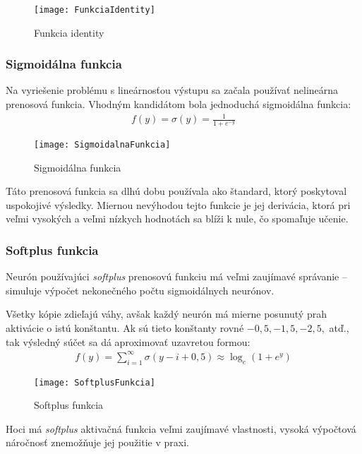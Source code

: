 \begin{figure}[H]
  \centering
  \texttt{[image: FunkciaIdentity]}
  \caption{Funkcia identity}
  \label{fig:Identita}
\end{figure}

\subsubsection{Sigmoidálna funkcia}

Na vyriešenie problému s lineárnosťou výstupu sa začala používať nelineárna prenosová funkcia. Vhodným kandidátom bola jednoduchá sigmoidálna funkcia:
\begin{eqnarray}
  f(y) = \sigma(y) = \frac{1}{1 + e^{-y}}
\end{eqnarray}

\begin{figure}[H]
  \centering
  \texttt{[image: SigmoidalnaFunkcia]}
  \caption{Sigmoidálna funkcia}
  \label{fig:SigmoidalnaFunkcia}
\end{figure}

Táto prenosová funkcia sa dlhú dobu používala ako štandard, ktorý poskytoval uspokojivé výsledky. Miernou nevýhodou tejto funkcie je jej derivácia, ktorá pri veľmi vysokých a veľmi nízkych hodnotách sa blíži k nule, čo spomaľuje učenie.

\subsubsection{Softplus funkcia}
Neurón používajúci \emph{softplus} prenosovú funkciu má veľmi zaujímavé správanie -- simuluje výpočet nekonečného počtu sigmoidálnych neurónov.\autocite{Nair2010}

Všetky kópie zdieľajú váhy, avšak každý neurón má mierne posunutý prah aktivácie o istú konštantu. Ak sú tieto konštanty rovné $-0{,}5, -1{,}5, -2{,}5,$ atď., tak výsledný súčet sa dá aproximovať uzavretou formou:
\begin{eqnarray}
  f(y) = \sum_{i=1}^{\infty}\sigma(y - i + 0{,}5) \approx \log_e(1 + e^y)
\end{eqnarray}

\begin{figure}[H]
  \centering
  \texttt{[image: SoftplusFunkcia]}
  \caption{Softplus funkcia}
  \label{fig:SoftplusFunkcia}
\end{figure}

Hoci má \emph{softplus} aktivačná funkcia veľmi zaujímavé vlastnosti, vysoká výpočtová náročnosť znemožňuje jej použitie v praxi.

